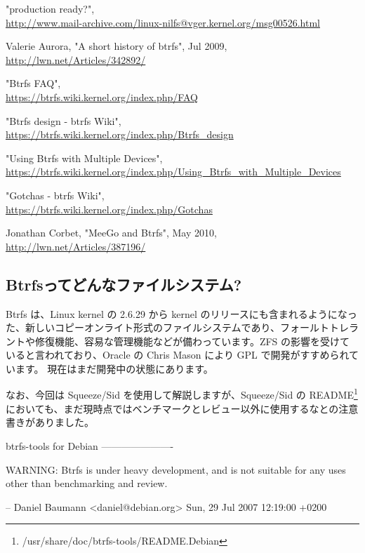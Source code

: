 \documentclass[mingoth,a4paper]{jsarticle}
\begin{document}
\begin{thebibliography}{0}
 "production ready?", \\
\url{http://www.mail-archive.com/linux-nilfs@vger.kernel.org/msg00526.html}

 Valerie Aurora, "A short history of btrfs", Jul 2009, \\
\url{http://lwn.net/Articles/342892/}

 "Btrfs FAQ", \\
\url{https://btrfs.wiki.kernel.org/index.php/FAQ}

 "Btrfs design - btrfs Wiki", \\
\url{https://btrfs.wiki.kernel.org/index.php/Btrfs\_design}

 "Using Btrfs with Multiple Devices", \\
\url{https://btrfs.wiki.kernel.org/index.php/Using\_Btrfs\_with\_Multiple\_Devices}

 "Gotchas - btrfs Wiki", \\
\url{https://btrfs.wiki.kernel.org/index.php/Gotchas}

 Jonathan Corbet, "MeeGo and Btrfs", May 2010, \\
\url{http://lwn.net/Articles/387196/}

\end{thebibliography}


\subsection{Btrfsってどんなファイルシステム?}
Btrfs は、Linux kernel の 2.6.29 から kernel のリリースにも含まれるようになった、新しいコピーオンライト形式のファイルシステムであり、フォールトトレラントや修復機能、容易な管理機能などが備わっています。ZFS の影響を受けていると言われており、Oracle の Chris Mason により GPL で開発がすすめられています。
現在はまだ開発中の状態にあります。

なお、今回は Squeeze/Sid を使用して解説しますが、Squeeze/Sid の README\footnote{/usr/share/doc/btrfs-tools/README.Debian} においても、まだ現時点ではベンチマークとレビュー以外に使用するなとの注意書きがありました。
\begin{commandline}
btrfs-tools for Debian
----------------------

WARNING: Btrfs is under heavy development, and is not suitable for any uses
other than benchmarking and review.

 -- Daniel Baumann <daniel@debian.org>  Sun, 29 Jul 2007 12:19:00 +0200
\end{commandline}
\end{document}
